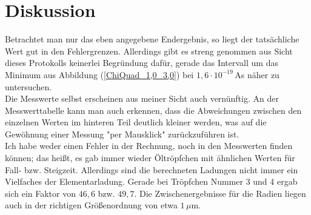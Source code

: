 \documentclass[a4paper,12pt]{article}
\begin{document}
\section{Diskussion}
Betrachtet man nur das eben angegebene Endergebnis, so liegt der tatsächliche Wert gut in den Fehlergrenzen. Allerdings gibt es streng genommen aus Sicht dieses Protokolls keinerlei Begründung dafür, gerade das Intervall um das Minimum aus Abbildung (\ref{ChiQuad_1,0_3,0}) bei $1,6\cdot 10^{-19}\,$As näher zu untersuchen.\\
Die Messwerte selbst erscheinen aus meiner Sicht auch vernünftig. An der Messwerttabelle kann man auch erkennen, dass die Abweichungen zwischen den einzelnen Werten im hinteren Teil deutlich kleiner werden, was auf die Gewöhnung einer Messung "per Mausklick" zurückzuführen ist.\\
Ich habe weder einen Fehler in der Rechnung, noch in den Messwerten finden können; das heißt, es gab immer wieder Öltröpfchen mit ähnlichen Werten für Fall- bzw. Steigzeit. Allerdings sind die berechneten Ladungen nicht immer ein Vielfaches der Elementarladung. Gerade bei Tröpfchen Nummer 3 und 4 ergab sich ein Faktor von $46,6$ bzw. $49,7$. Die Zwischenergebnisse für die Radien liegen auch in der richtigen Größenordnung von etwa $1\,\mu$m.
\end{document}
